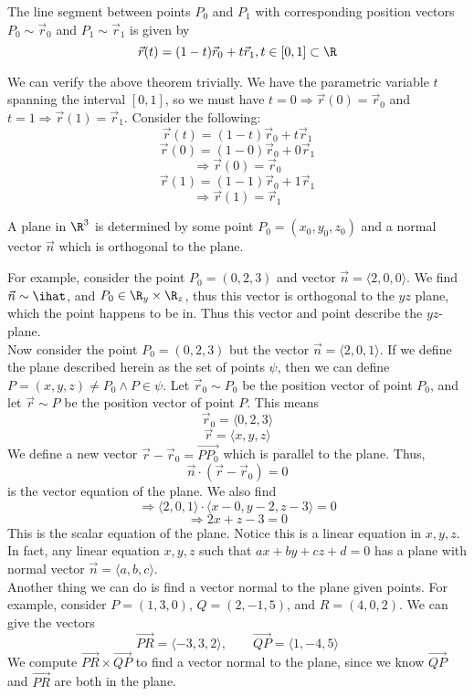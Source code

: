 \begin{theorem}\label{thm:1}
	The line segment between points $P_0$ and $P_1$ with corresponding position vectors $P_0\sim\vec{r}_0$ and $P_1\sim\vec{r}_1$ is given by
	\[\vec{r}(t)=(1-t)\vec{r}_0+t\vec{r}_1,t\in[0,1]\subset\R\]
\end{theorem}
We can verify the above theorem trivially. We have the parametric variable $t$ spanning the interval $[0,1]$, so we must have $t=0\Rightarrow\vec{r}(0)=\vec{r}_0$ and $t=1\Rightarrow\vec{r}(1)=\vec{r}_1$. Consider the following:
\[\vec{r}(t)=(1-t)\vec{r}_0+t\vec{r}_1\]
\[\vec{r}(0)=(1-0)\vec{r}_0+0\vec{r}_1\]
\[\Rightarrow\vec{r}(0)=\vec{r}_0\]
\[\vec{r}(1)=(1-1)\vec{r}_0+1\vec{r}_1\]
\[\Rightarrow\vec{r}(1)=\vec{r}_1\]
\begin{definition}[Planes]\label{def:1}
	A plane in $\R^3$ is determined by some point $P_0=(x_0,y_0,z_0)$ and a normal vector $\vec{n}$ which is orthogonal to the plane.
\end{definition}
For example, consider the point $P_0=(0,2,3)$ and vector $\vec{n}=\langle2,0,0\rangle$. We find $\vec{n}\sim\ihat$, and $P_0\in \R_y\times\R_z$, thus this vector is orthogonal to the $yz$ plane, which the point happens to be in. Thus this vector and point describe the $yz$-plane.\\
Now consider the point $P_0=(0,2,3)$ but the vector $\vec{n}=\langle2,0,1\rangle$. If we define the plane described herein as the set of points $\psi$, then we can define $P=(x,y,z)\neq P_0\land P\in\psi$. Let $\vec{r}_0\sim P_0$ be the position vector of point $P_0$, and let $\vec{r}\sim P$ be the position vector of point $P$. This means
$$\vec{r}_0=\langle0,2,3\rangle$$
$$\vec{r}=\langle x,y,z\rangle$$
We define a new vector $\vec{r}-\vec{r}_0=\overrightarrow{PP_0}$ which is parallel to the plane. Thus,
$$\vec{n}\cdot(\vec{r}-\vec{r}_0)=0$$
is the vector equation of the plane. We also find
$$\Rightarrow\langle2,0,1\rangle\cdot\langle x-0,y-2,z-3\rangle=0$$
$$\Rightarrow 2x+z-3=0$$
This is the scalar equation of the plane. Notice this is a linear equation in $x,y,z$. In fact, any linear equation $x,y,z$ such that $ax+by+cz+d=0$ has a plane with normal vector $\vec{n}=\langle a,b,c\rangle.$\\
Another thing we can do is find a vector normal to the plane given points. For example, consider $P=(1,3,0)$, $Q=(2,-1,5)$, and $R=(4,0,2)$. We can give the vectors
$$\overrightarrow{PR}=\langle-3,3,2\rangle,\qquad\overrightarrow{QP}=\langle1,-4,5\rangle$$
We compute $\overrightarrow{PR}\times\overrightarrow{QP}$ to find a vector normal to the plane, since we know $\overrightarrow{QP}$ and $\overrightarrow{PR}$ are both in the plane.
